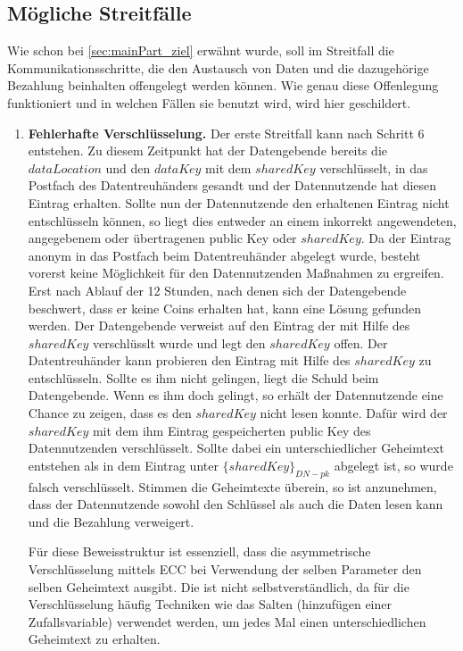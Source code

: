 \documentclass[11pt,a4paper]{scrreprt}
\begin{document}
\subsection{Mögliche Streitfälle}
Wie schon bei \ref{sec:mainPart_ziel} erwähnt wurde, soll im Streitfall die Kommunikationsschritte, die den Austausch von Daten und die dazugehörige Bezahlung beinhalten offengelegt werden können. Wie genau diese Offenlegung funktioniert und in welchen Fällen sie benutzt wird, wird hier geschildert.\\

\begin{enumerate}
    \item \textbf{Fehlerhafte Verschlüsselung.}\label{case:IncorrectEncryption}
    Der erste Streitfall kann nach Schritt 6 entstehen. Zu diesem Zeitpunkt hat der Datengebende bereits die $dataLocation$ und den $dataKey$ mit dem $sharedKey$ verschlüsselt, in das Postfach des Datentreuhänders gesandt und der Datennutzende hat diesen Eintrag erhalten. Sollte nun der Datennutzende den erhaltenen Eintrag nicht entschlüsseln können, so liegt dies entweder an einem inkorrekt angewendeten, angegebenem oder übertragenen public Key oder $sharedKey$. Da der Eintrag anonym in das Postfach beim Datentreuhänder abgelegt wurde, besteht vorerst keine Möglichkeit für den Datennutzenden Maßnahmen zu ergreifen. Erst nach Ablauf der 12 Stunden, nach denen sich der Datengebende beschwert, dass er keine Coins erhalten hat, kann eine Lösung gefunden werden. Der Datengebende verweist auf den Eintrag der mit Hilfe des $sharedKey$ verschlüsslt wurde und legt den $sharedKey$ offen. Der Datentreuhänder kann probieren den Eintrag mit Hilfe des $sharedKey$ zu entschlüsseln. Sollte es ihm nicht gelingen, liegt die Schuld beim Datengebende. Wenn es ihm doch gelingt, so erhält der Datennutzende eine Chance zu zeigen, dass es den $sharedKey$ nicht lesen konnte. Dafür wird der $sharedKey$ mit dem ihm Eintrag gespeicherten public Key des Datennutzenden verschlüsselt. Sollte dabei ein unterschiedlicher Geheimtext entstehen als in dem Eintrag unter $\{sharedKey\}_{DN-pk}$ abgelegt ist, so wurde falsch verschlüsselt. Stimmen die Geheimtexte überein, so ist anzunehmen, dass der Datennutzende sowohl den Schlüssel als auch die Daten lesen kann und die Bezahlung verweigert. 

    Für diese Beweisstruktur ist essenziell, dass die asymmetrische Verschlüsselung mittels ECC bei Verwendung der selben Parameter den selben Geheimtext ausgibt. Die ist nicht selbstverständlich, da für die Verschlüsselung häufig Techniken wie das Salten (hinzufügen einer Zufallsvariable) verwendet werden, um jedes Mal einen unterschiedlichen Geheimtext zu erhalten.
    

\end{enumerate}
\end{document}
